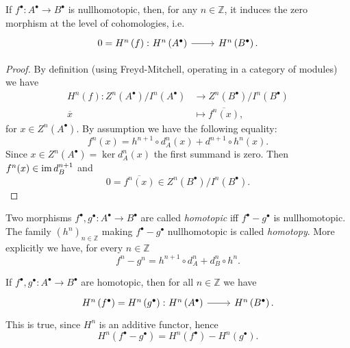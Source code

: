 \documentclass[../Main]{subfiles}
\begin{document}
\begin{prop}[]
	If $f^\bullet\colon A^\bullet \to B^\bullet$ is nullhomotopic, then,
	for any $n \in \mathbb{Z}$, it induces the zero morphism
	at the level of cohomologies, i.e.
	\begin{equation}
		\begin{tikzcd}
		0 = H^{n} \left( f \right)\colon H^{n} \left( A^\bullet \right) \arrow[r, "", rightarrow] &
		H^{n} \left( B^\bullet \right).
		\end{tikzcd}
	\end{equation} 
\end{prop}
\begin{proof}
	By definition (using Freyd-Mitchell, operating in a category of modules) we have
	\begin{align}
		H^{n} \left( f \right)\colon Z^n(A^\bullet)/I^n(A^\bullet) 
		&\longrightarrow Z^n(B^\bullet)/I^n(B^\bullet) \\
		\overline{x} &\longmapsto \overline{f^n(x)} \nonumber
	,\end{align} 
	for $x \in Z^n(A^\bullet)$.
	By assumption we have the following equality:
	\begin{equation}
		f^n(x) = h^{n+1} \circ d_A^n(x) + d^{n+1} \circ h^n(x)
	.\end{equation} 
	Since $x \in Z^n(A^\bullet) = \ker d_A^n(x)$ the first summand is zero.
	Then $f^n(x) \in \operatorname{im} d^{n+1}_B$ and
	\begin{equation}
		0 = \overline{f^n(x)} \in Z^n(B^\bullet)/I^n(B^\bullet)
	.\end{equation} 
\end{proof}

\begin{defn}
	Two morphisms $f^\bullet, g^\bullet\colon A^\bullet \to B^\bullet$
	are called {\em homotopic} iff $f^\bullet - g^\bullet$ is nullhomotopic.
	The family $\left( h^n \right)_{n \in \mathbb{Z}}$ making $f^\bullet - g^\bullet$
	nullhomotopic is called {\em homotopy}.
	More explicitly we have, for every $n \in \mathbb{Z}$
	\begin{equation}
	f^n - g^n = h^{n+1} \circ d^n_A + d^n_B \circ h^n
	.\end{equation} 
\end{defn}

\begin{rem}[]
	If $f^\bullet, g^\bullet\colon A^\bullet \to B^\bullet$ are homotopic, then
	for all $n \in \mathbb{Z}$ we have
	\begin{equation}
	\begin{tikzcd}
		H^{n} \left( f^\bullet \right) = H^{n} \left( g^\bullet \right) \colon
		H^{n} \left( A^\bullet \right) \arrow[r, "", rightarrow] &
		H^{n} \left( B^\bullet \right).
	\end{tikzcd}
	\end{equation} 
	This is true, since $H^n$ is an additive functor, hence
	\begin{equation}
	H^{n} \left( f^\bullet - g^\bullet \right) =
	H^{n} \left( f^\bullet \right) - H^{n} \left( g^\bullet \right)
	.\end{equation} 
\end{rem}
\end{document}
